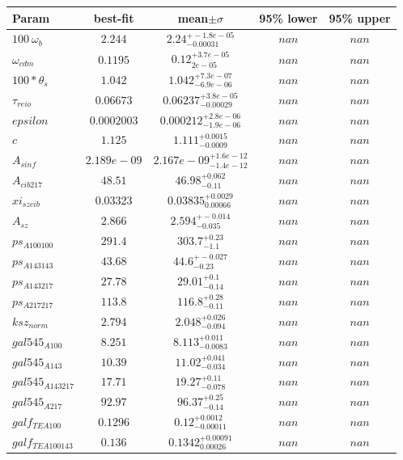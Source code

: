 \begin{tabular}{|l|c|c|c|c|} 
 \hline 
Param & best-fit & mean$\pm\sigma$ & 95\% lower & 95\% upper \\ \hline 
$100~\omega{}_{b }$ &$2.244$ & $2.24_{-0.00031}^{+-1.8e-05}$ & $nan$ & $nan$ \\ 
$\omega{}_{cdm }$ &$0.1195$ & $0.12_{2e-05}^{+3.7e-05}$ & $nan$ & $nan$ \\ 
$100*\theta{}_{s }$ &$1.042$ & $1.042_{-6.9e-06}^{+7.3e-07}$ & $nan$ & $nan$ \\ 
$\tau{}_{reio }$ &$0.06673$ & $0.06237_{-0.00029}^{+3.8e-05}$ & $nan$ & $nan$ \\ 
$epsilon$ &$0.0002003$ & $0.000212_{-1.9e-06}^{+2.8e-06}$ & $nan$ & $nan$ \\ 
$c$ &$1.125$ & $1.111_{-0.0009}^{+0.0015}$ & $nan$ & $nan$ \\ 
$A_{s inf }$ &$2.189e-09$ & $2.167e-09_{-1.4e-12}^{+1.6e-12}$ & $nan$ & $nan$ \\ 
$A_{cib 217 }$ &$48.51$ & $46.98_{-0.11}^{+0.062}$ & $nan$ & $nan$ \\ 
$xi_{sz cib }$ &$0.03323$ & $0.03835_{0.00066}^{+0.0029}$ & $nan$ & $nan$ \\ 
$A_{sz }$ &$2.866$ & $2.594_{-0.035}^{+-0.014}$ & $nan$ & $nan$ \\ 
$ps_{A 100 100 }$ &$291.4$ & $303.7_{-1.1}^{+0.23}$ & $nan$ & $nan$ \\ 
$ps_{A 143 143 }$ &$43.68$ & $44.6_{-0.23}^{+-0.027}$ & $nan$ & $nan$ \\ 
$ps_{A 143 217 }$ &$27.78$ & $29.01_{-0.14}^{+0.1}$ & $nan$ & $nan$ \\ 
$ps_{A 217 217 }$ &$113.8$ & $116.8_{-0.11}^{+0.28}$ & $nan$ & $nan$ \\ 
$ksz_{norm }$ &$2.794$ & $2.048_{-0.094}^{+0.026}$ & $nan$ & $nan$ \\ 
$gal545_{A 100 }$ &$8.251$ & $8.113_{-0.0083}^{+0.011}$ & $nan$ & $nan$ \\ 
$gal545_{A 143 }$ &$10.39$ & $11.02_{-0.034}^{+0.041}$ & $nan$ & $nan$ \\ 
$gal545_{A 143 217 }$ &$17.71$ & $19.27_{-0.078}^{+0.11}$ & $nan$ & $nan$ \\ 
$gal545_{A 217 }$ &$92.97$ & $96.37_{-0.14}^{+0.25}$ & $nan$ & $nan$ \\ 
$galf_{TE A 100 }$ &$0.1296$ & $0.12_{-0.00011}^{+0.0012}$ & $nan$ & $nan$ \\ 
$galf_{TE A 100 143 }$ &$0.136$ & $0.1342_{0.00026}^{+0.00091}$ & $nan$ & $nan$ \\ 

\end{tabular}
